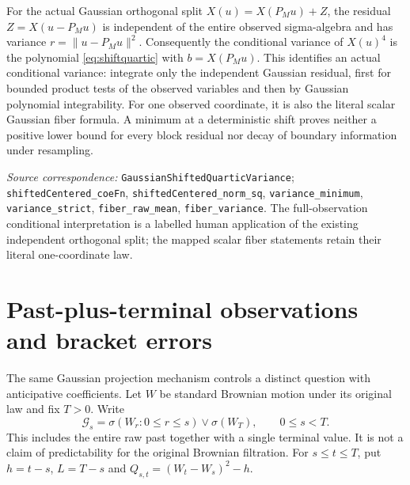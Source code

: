 \documentclass[11pt]{article}
\newcommand{\code}[1]{{\small\nolinkurl{#1}}}
\begin{document}
For the actual Gaussian orthogonal split $X(u)=X(P_Mu)+Z$, the residual
$Z=X(u-P_Mu)$ is independent of the entire observed sigma-algebra and
has variance $r=\|u-P_Mu\|^2$. Consequently the conditional variance
of $X(u)^4$ is the polynomial \eqref{eq:shiftquartic} with
$b=X(P_Mu)$. This identifies an actual conditional variance: integrate
only the independent Gaussian residual, first for bounded product tests
of the observed variables and then by Gaussian polynomial integrability.
For one observed coordinate, it is also the literal scalar Gaussian
fiber formula. A minimum at a deterministic shift proves neither a
positive lower bound for every block residual nor decay of boundary
information under resampling.
\par\smallskip\begingroup\small\raggedright
\textit{Source correspondence:} \code{GaussianShiftedQuarticVariance};
\code{shiftedCentered_coeFn}, \code{shiftedCentered_norm_sq},
\code{variance_minimum}, \code{variance_strict},
\code{fiber_raw_mean}, \code{fiber_variance}.
The full-observation conditional interpretation is a labelled human
application of the existing independent orthogonal split; the mapped
scalar fiber statements retain their literal one-coordinate law.
\par\endgroup

\section{Past-plus-terminal observations and bracket errors}
The same Gaussian projection mechanism controls a distinct question with
anticipative coefficients. Let $W$ be standard Brownian motion under its
original law and fix $T>0$. Write
\[
 \mathcal G_s=\sigma(W_r:0\le r\le s)\vee\sigma(W_T),\qquad 0\le s<T.
\]
This includes the entire raw past together with a single terminal value.
It is not a claim of predictability for the original Brownian filtration.
For $s\le t\le T$, put $h=t-s$, $L=T-s$ and
$Q_{s,t}=(W_t-W_s)^2-h$.
\end{document}
